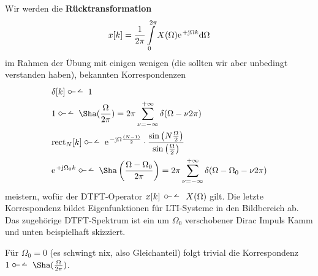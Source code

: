 %
Wir werden die \textbf{Rücktransformation}
\begin{align}
x[k] = \frac{1}{2\pi} \int\limits_{0}^{2\pi} X(\Omega) \e^{+\im\Omega k} \fsd \Omega
\end{align}
im Rahmen der Übung mit einigen wenigen (die sollten wir aber unbedingt verstanden haben),
bekannten Korrespondenzen
\begin{align}
&\delta[k] \dtft 1\\
&1 \dtft \Sha(\frac{\Omega}{2\pi}) = 2\pi \sum\limits_{\nu=-\infty}^{+\infty} \delta(\Omega-\nu 2\pi)\\
&\mathrm{rect}_N[k]
\dtft
\e^{-\im\Omega\frac{(N-1)}{2}}\cdot\frac{\sin\left(N\frac{\Omega}{2}\right)}{\sin\left(\frac{\Omega}{2}\right)}\\
&\e^{+\im \Omega_0 k} \dtft \Sha\left(\frac{\Omega-\Omega_0}{2\pi}\right) = 2\pi \sum\limits_{\nu=-\infty}^{+\infty} \delta(\Omega-\Omega_0 - \nu 2\pi)
\end{align}
meistern, wofür der DTFT-Operator $x[k] \,\dtft\, X(\Omega)$ gilt.
%
Die letzte Korrespondenz bildet Eigenfunktionen für LTI-Systeme in den Bildbereich ab.
Das zugehörige DTFT-Spektrum ist ein um $\Omega_0$ verschobener
Dirac Impuls Kamm und unten beispielhaft skizziert.
%
\begin{center}
\end{center}
Für $\Omega_0=0$ (es schwingt nix, also Gleichanteil) folgt trivial die Korrespondenz $1 \dtft \Sha(\frac{\Omega}{2\pi})$.

\newpage
